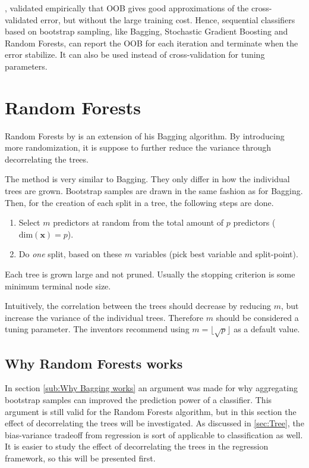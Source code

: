 \cite{outOfBag}, validated empirically that OOB gives good approximations of the cross-validated error, but without the large training cost. 
Hence, sequential classifiers based on bootstrap sampling, like Bagging, Stochastic Gradient Boosting and Random Forests, can report the OOB for each iteration and terminate when the error stabilize. It can also be used instead of cross-validation for tuning parameters.


\section{Random Forests}
\label{sec:Random Forests}
Random Forests by \cite{randomforests} is an extension of his Bagging algorithm. By introducing more randomization, it is suppose to further reduce the variance through decorrelating the trees. 

The method is very similar to Bagging. They only differ in how the individual trees are grown. Bootstrap samples are drawn in the same fashion as for Bagging. Then, for the creation of each split in a tree, the following steps are done. 
\begin{enumerate}
  \item Select $m$ predictors at random from the total amount of $p$ predictors ($\mathrm{dim}(\mathbf{x}) = p$).
  \item Do \textit{one} split, based on these $m$ variables (pick best variable and split-point). 
\end{enumerate}
Each tree is grown large and not pruned. Usually the stopping criterion is some minimum terminal node size.

Intuitively, the correlation between the trees should decrease by reducing $m$, but increase the variance of the individual trees. Therefore $m$ should be considered a tuning parameter. The inventors recommend using $m = \lfloor \sqrt{p} \rfloor$ as a default value.

\subsection{Why Random Forests works}
\label{sub:Why Random Forests works}
In section \ref{sub:Why Bagging works} an argument was made for why aggregating bootstrap samples can improved the prediction power of a classifier. This argument is still valid for the Random Forests algorithm, but in this section the effect of decorrelating the trees will be investigated. As discussed in \ref{sec:Tree}, the bias-variance tradeoff from regression is sort of applicable to classification as well. It is easier to study the effect of decorrelating  the trees in the regression framework, so this will be presented first.

